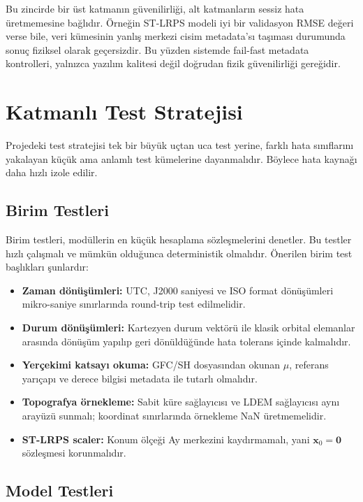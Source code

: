 Bu zincirde bir üst katmanın güvenilirliği, alt katmanların sessiz hata üretmemesine bağlıdır. Örneğin ST-LRPS modeli iyi bir validasyon RMSE değeri verse bile, veri kümesinin yanlış merkezi cisim metadata'sı taşıması durumunda sonuç fiziksel olarak geçersizdir. Bu yüzden sistemde fail-fast metadata kontrolleri, yalnızca yazılım kalitesi değil doğrudan fizik güvenilirliği gereğidir.

\section{Katmanlı Test Stratejisi}
\label{sec:test_strategy}

Projedeki test stratejisi tek bir büyük uçtan uca test yerine, farklı hata sınıflarını yakalayan küçük ama anlamlı test kümelerine dayanmalıdır. Böylece hata kaynağı daha hızlı izole edilir.

\subsection{Birim Testleri}

Birim testleri, modüllerin en küçük hesaplama sözleşmelerini denetler. Bu testler hızlı çalışmalı ve mümkün olduğunca deterministik olmalıdır. Önerilen birim test başlıkları şunlardır:

\begin{itemize}
    \item \textbf{Zaman dönüşümleri:} UTC, J2000 saniyesi ve ISO format dönüşümleri mikro-saniye sınırlarında round-trip test edilmelidir.
    \item \textbf{Durum dönüşümleri:} Kartezyen durum vektörü ile klasik orbital elemanlar arasında dönüşüm yapılıp geri dönüldüğünde hata tolerans içinde kalmalıdır.
    \item \textbf{Yerçekimi katsayı okuma:} GFC/SH dosyasından okunan \(\mu\), referans yarıçapı ve derece bilgisi metadata ile tutarlı olmalıdır.
    \item \textbf{Topografya örnekleme:} Sabit küre sağlayıcısı ve LDEM sağlayıcısı aynı arayüzü sunmalı; koordinat sınırlarında örnekleme NaN üretmemelidir.
    \item \textbf{ST-LRPS scaler:} Konum ölçeği Ay merkezini kaydırmamalı, yani \(\mathbf{x}_0=\mathbf{0}\) sözleşmesi korunmalıdır.
\end{itemize}

\subsection{Model Testleri}

